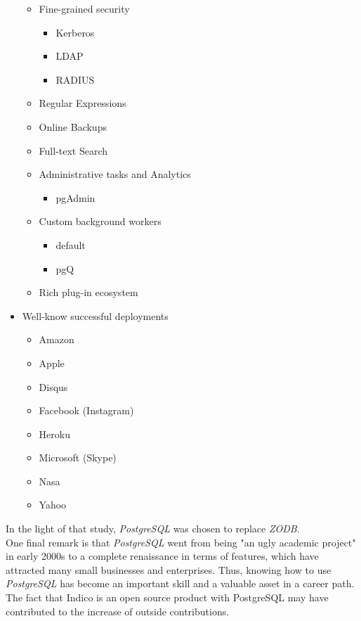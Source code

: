 \begin{itemize}
\begin{itemize}
	\item Fine-grained security
	\begin{itemize}
	  \item Kerberos
	  \item LDAP
	  \item RADIUS
	\end{itemize}
	\item Regular Expressions
	\item Online Backups
	\item Full-text Search
	\item Administrative tasks and Analytics
	\begin{itemize}
	  \item pgAdmin
	\end{itemize}
    \item Custom background workers
	\begin{itemize}
	  \item default
	  \item pgQ
	\end{itemize}
	\item Rich plug-in ecosystem
  \end{itemize}
  \item Well-know successful deployments
  \begin{itemize}
    \item Amazon
    \item Apple
    \item Disqus
    \item Facebook (Instagram)
    \item Heroku
    \item Microsoft (Skype)
    \item Nasa
    \item Yahoo
  \end{itemize}
\end{itemize}

In the light of that study, \textit{PostgreSQL} was chosen to replace \textit{ZODB}.
\\
One final remark is that \textit{PostgreSQL} went from being "an ugly academic project"\cite{postgres} in early 2000s to a complete renaissance in terms of features, which have attracted many small businesses and enterprises. Thus, knowing how to use \textit{PostgreSQL} has become an important skill and a valuable asset in a career path. The fact that Indico is an open source product with PostgreSQL may have contributed to the increase of outside contributions.